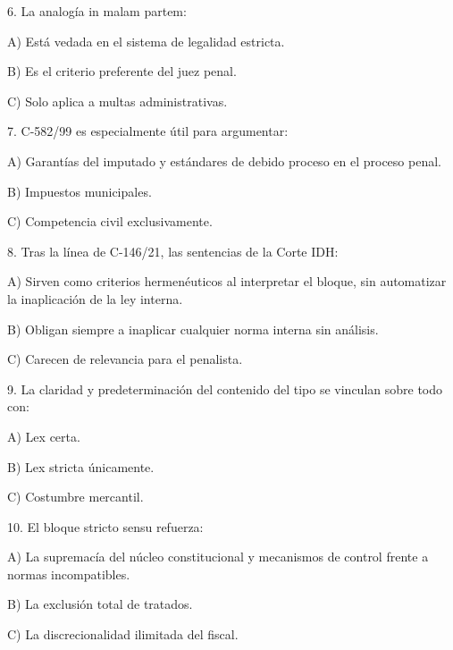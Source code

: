 \documentclass[11pt,a4paper]{article}
\begin{document}
        6. La analogía in malam partem:\par

         A) Está vedada en el sistema de legalidad estricta.\par
         B) Es el criterio preferente del juez penal.\par
         C) Solo aplica a multas administrativas.\par



        7. C-582/99 es especialmente útil para argumentar:\par

         A) Garantías del imputado y estándares de debido proceso en el proceso penal.\par
         B) Impuestos municipales.\par
         C) Competencia civil exclusivamente.\par



        8. Tras la línea de C-146/21, las sentencias de la Corte IDH:\par

         A) Sirven como criterios hermenéuticos al interpretar el bloque, sin automatizar la inaplicación de la ley interna.\par
         B) Obligan siempre a inaplicar cualquier norma interna sin análisis.\par
         C) Carecen de relevancia para el penalista.\par



        9. La claridad y predeterminación del contenido del tipo se vinculan sobre todo con:\par

         A) Lex certa.\par
         B) Lex stricta únicamente.\par
         C) Costumbre mercantil.\par



        10. El bloque stricto sensu refuerza:\par

         A) La supremacía del núcleo constitucional y mecanismos de control frente a normas incompatibles.\par
         B) La exclusión total de tratados.\par
         C) La discrecionalidad ilimitada del fiscal.\par
\end{document}
